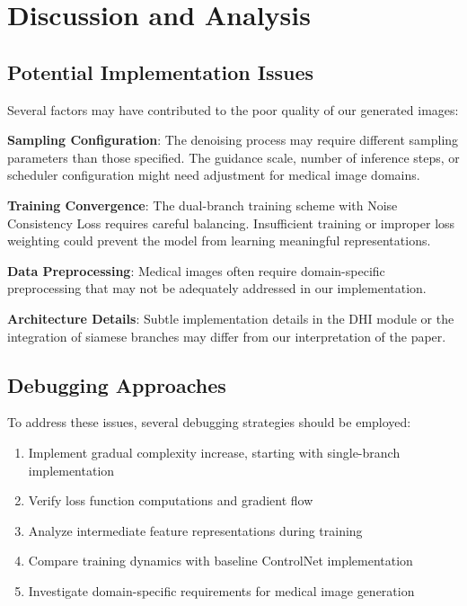 \documentclass[conference]{IEEEtran}
\begin{document}
\section{Discussion and Analysis}

\subsection{Potential Implementation Issues}
Several factors may have contributed to the poor quality of our generated images:

\textbf{Sampling Configuration}: The denoising process may require different sampling parameters than those specified. The guidance scale, number of inference steps, or scheduler configuration might need adjustment for medical image domains.

\textbf{Training Convergence}: The dual-branch training scheme with Noise Consistency Loss requires careful balancing. Insufficient training or improper loss weighting could prevent the model from learning meaningful representations.

\textbf{Data Preprocessing}: Medical images often require domain-specific preprocessing that may not be adequately addressed in our implementation.

\textbf{Architecture Details}: Subtle implementation details in the DHI module or the integration of siamese branches may differ from our interpretation of the paper.

\subsection{Debugging Approaches}
To address these issues, several debugging strategies should be employed:
\begin{enumerate}
    \item Implement gradual complexity increase, starting with single-branch implementation
    \item Verify loss function computations and gradient flow
    \item Analyze intermediate feature representations during training
    \item Compare training dynamics with baseline ControlNet implementation
    \item Investigate domain-specific requirements for medical image generation
\end{enumerate}
\end{document}
